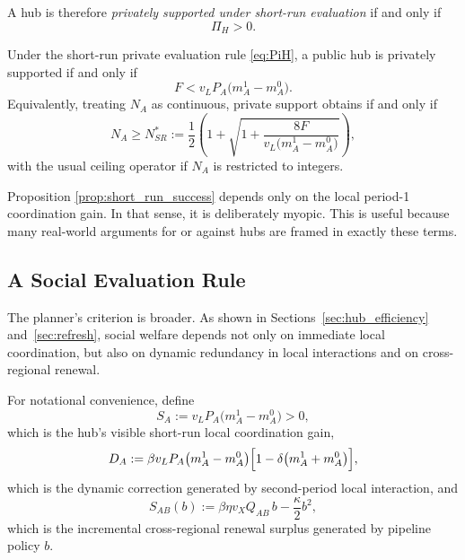 A hub is therefore \emph{privately supported under short-run evaluation} if and only if
\[
\Pi_H>0.
\]

\begin{proposition}
\label{prop:short_run_success}
Under the short-run private evaluation rule \eqref{eq:PiH}, a public hub is privately supported if and only if
\begin{equation}
F<v_L P_A\bigl(m_A^1-m_A^0\bigr).
\label{eq:short_run_condition}
\end{equation}
Equivalently, treating $N_A$ as continuous, private support obtains if and only if
\begin{equation}
N_A\ge N_{SR}^*
:=
\frac{1}{2}
\left(
1+
\sqrt{
1+\frac{8F}{v_L\bigl(m_A^1-m_A^0\bigr)}
}
\right),
\label{eq:NSRstar}
\end{equation}
with the usual ceiling operator if $N_A$ is restricted to integers.
\end{proposition}

Proposition \ref{prop:short_run_success} depends only on the local period-1 coordination gain. In that sense, it is deliberately myopic. This is useful because many real-world arguments for or against hubs are framed in exactly these terms.

\subsection{A Social Evaluation Rule}

The planner's criterion is broader. As shown in Sections~\ref{sec:hub_efficiency} and~\ref{sec:refresh}, social welfare depends not only on immediate local coordination, but also on dynamic redundancy in local interactions and on cross-regional renewal.

For notational convenience, define
\begin{equation}
S_A
:=
v_L P_A\bigl(m_A^1-m_A^0\bigr)>0,
\label{eq:SA}
\end{equation}
which is the hub's visible short-run local coordination gain,
\begin{equation}
D_A
:=
\beta v_L P_A\bigl(m_A^1-m_A^0\bigr)\Bigl[1-\delta\bigl(m_A^1+m_A^0\bigr)\Bigr],
\label{eq:DA}
\end{equation}
which is the dynamic correction generated by second-period local interaction, and
\begin{equation}
S_{AB}(b)
:=
\beta\eta v_X Q_{AB}\,b-\frac{\kappa}{2}b^2,
\label{eq:SAB}
\end{equation}
which is the incremental cross-regional renewal surplus generated by pipeline policy $b$.

